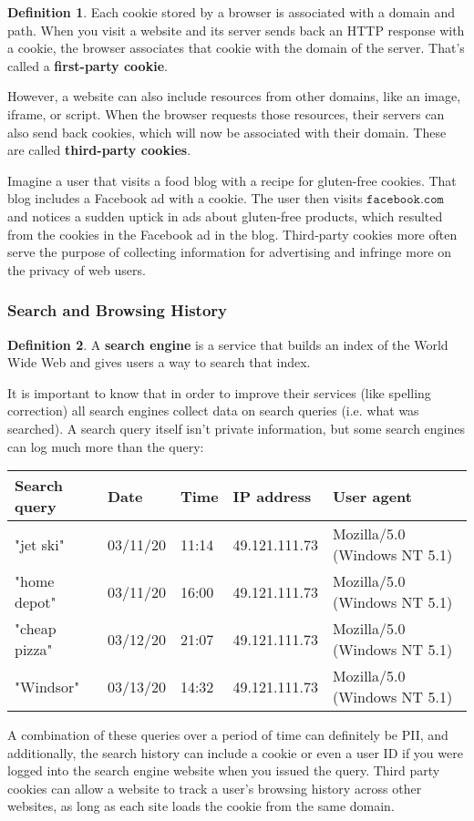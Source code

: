 \documentclass[a4paper, 12pt]{report}
\theoremstyle{remark}
\theoremstyle{definition}
\newtheorem{definition}{Definition}[section]
\begin{document}
\begin{definition}
Each cookie stored by a browser is associated with a domain and path. When you visit a website and its server sends back an HTTP response with a cookie, the browser associates that cookie with the domain of the server. That's called a \textbf{first-party cookie}. 

However, a website can also include resources from other domains, like an image, iframe, or script. When the browser requests those resources, their servers can also send back cookies, which will now be associated with their domain. These are called \textbf{third-party cookies}.
\end{definition}

Imagine a user that visits a food blog with a recipe for gluten-free cookies. That blog includes a Facebook ad with a cookie. The user then visits $\texttt{facebook.com}$ and notices a sudden uptick in ads about gluten-free products, which resulted from the cookies in the Facebook ad in the blog. Third-party cookies more often serve the purpose of collecting information for advertising and infringe more on the privacy of web users. 

\subsubsection{Search and Browsing History}
\begin{definition}
A \textbf{search engine} is a service that builds an index of the World Wide Web and gives users a way to search that index. 
\end{definition}

It is important to know that in order to improve their services (like spelling correction) all search engines collect data on search queries (i.e. what was searched). A search query itself isn't private information, but some search engines can log much more than the query: 
\begin{center}
\begin{tabular}{l|l|l|l|l}
    Search query & Date & Time & IP address & User agent \\
    \hline 
    "jet ski" & 03/11/20 & 11:14 & 49.121.111.73 & Mozilla/5.0 (Windows NT 5.1) \\
    "home depot" & 03/11/20 & 16:00 & 49.121.111.73 & Mozilla/5.0 (Windows NT 5.1) \\
    "cheap pizza" & 03/12/20 & 21:07 & 49.121.111.73 & Mozilla/5.0 (Windows NT 5.1) \\
    "Windsor" & 03/13/20 & 14:32 & 49.121.111.73 & Mozilla/5.0 (Windows NT 5.1) 
\end{tabular}
\end{center}
A combination of these queries over a period of time can definitely be PII, and additionally, the search history can include a cookie or even a user ID if you were logged into the search engine website when you issued the query. Third party cookies can allow a website to track a user's browsing history across other websites, as long as each site loads the cookie from the same domain. 
\end{document}
